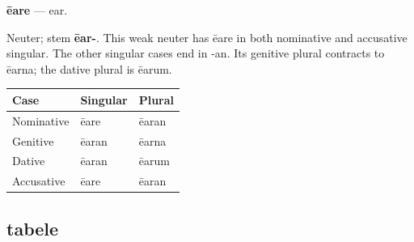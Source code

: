 \par\begin{minipage}{\linewidth}\raggedright
\textbf{ēare} — ear.

Neuter; stem \textbf{ēar-}. This weak neuter has ēare in both nominative and accusative singular. The other singular cases end in -an. Its genitive plural contracts to ēarna; the dative plural is ēarum.

\par\begingroup
\fontsize{10.5}{13.2}\selectfont
\setlength{\LTleft}{0pt}\setlength{\LTright}{\fill}
\noindent
\begin{tabular}{@{}>{\raggedright\arraybackslash}p{39.46mm}>{\raggedright\arraybackslash}p{39.46mm}>{\raggedright\arraybackslash}p{39.46mm}@{}}
\toprule
\textbf{Case} & \textbf{Singular} & \textbf{Plural} \\
\midrule
Nominative & ēare & ēaran \\
Genitive & ēaran & ēarna \\
Dative & ēaran & ēarum \\
Accusative & ēare & ēaran \\
\bottomrule
\end{tabular}
\par\endgroup

\end{minipage}\par
{}
\subsection*{tabele}

